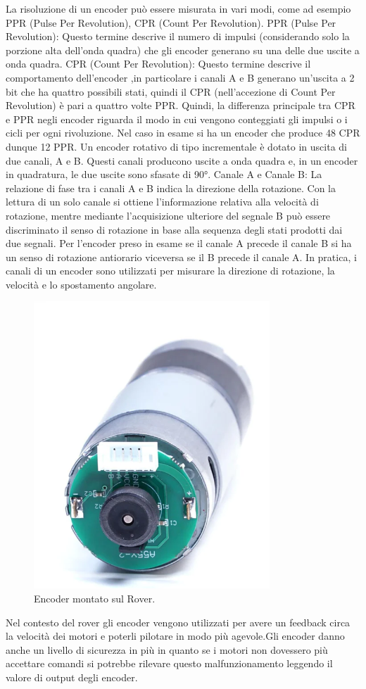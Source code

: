 \documentclass{article}
\begin{document}
La risoluzione di un encoder può essere misurata in vari modi, come ad esempio PPR (Pulse Per Revolution), CPR (Count Per
Revolution).
PPR (Pulse Per Revolution): Questo termine descrive il numero di impulsi (considerando solo la porzione alta dell’onda
quadra) che gli encoder generano su una delle due uscite a onda quadra.
CPR (Count Per Revolution): Questo termine descrive il comportamento dell’encoder ,in particolare i canali A e B generano
un’uscita a 2 bit che ha quattro possibili stati, quindi il CPR (nell’accezione di Count Per Revolution) è pari a quattro volte PPR.
Quindi, la differenza principale tra CPR e PPR negli encoder riguarda il modo in cui vengono conteggiati gli impulsi o i cicli per ogni
rivoluzione.
Nel caso in esame si ha un encoder che produce 48 CPR dunque 12 PPR.
Un encoder rotativo di tipo incrementale è dotato in uscita di due canali, A e B. Questi canali producono uscite a onda quadra e, in
un encoder in quadratura, le due uscite sono sfasate di 90°.
Canale A e Canale B: La relazione di fase tra i canali A e B indica la direzione della rotazione. Con la lettura di un solo canale
si ottiene l’informazione relativa alla velocità di rotazione, mentre mediante l’acquisizione ulteriore del segnale B può essere
discriminato il senso di rotazione in base alla sequenza degli stati prodotti dai due segnali. Per l’encoder preso in esame se il
canale A precede il canale B si ha un senso di rotazione antiorario viceversa se il B precede il canale A.
In pratica, i canali di un encoder sono utilizzati per misurare la direzione di rotazione, la velocità e lo spostamento angolare.
\begin{figure}[H]
\centering
\includegraphics[width=0.7\linewidth]{image/encodermotore.png}
\caption{\label{encodermotore:pot}Encoder montato sul Rover.}
\end{figure}
Nel contesto del rover gli encoder vengono utilizzati per avere un feedback circa la velocità dei motori e poterli pilotare in modo più agevole.Gli encoder danno anche un livello di sicurezza in più in quanto se i motori non dovessero più accettare comandi si potrebbe rilevare questo malfunzionamento leggendo il valore di output degli encoder.
\end{document}
